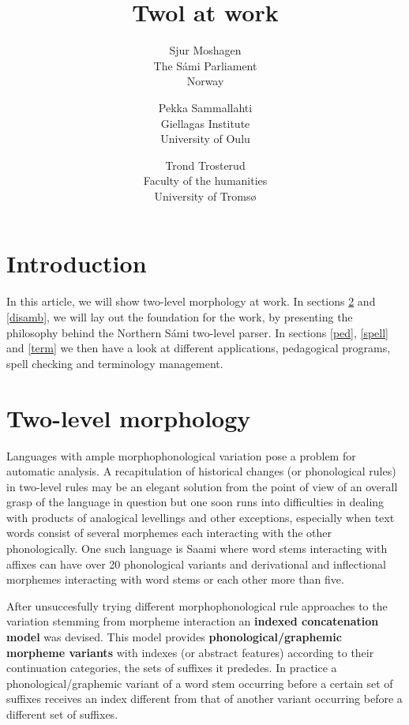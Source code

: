 \documentclass[a4paper,english]{article}
\begin{document}
\title{Twol at work}

\author{Sjur Moshagen\\ The Sámi Parliament\\ Norway
\and Pekka Sammallahti\\ Giellagas Institute\\ University of Oulu
\and Trond Trosterud\\ Faculty of the humanities\\ University of Tromsø}


\maketitle


\section{Introduction}

In this article, we will show two-level morphology at work. In sections \ref{twol} and \ref{disamb}, we will lay out the foundation for the work, by presenting the philosophy behind the Northern Sámi two-level parser. In sections \ref{ped}, \ref{spell} and \ref{term} we then have a look at different applications, pedagogical programs, spell checking and terminology management.

\section{Two-level morphology}\label{twol}

Languages with ample morphophonological variation pose a problem for automatic analysis. A recapitulation of historical changes (or phonological rules) in two-level rules may be an elegant solution from the point of view of an overall grasp of the language in question but one soon runs into difficulties in dealing with products of analogical levellings and other exceptions, especially when text words consist of several morphemes each interacting with the other phonologically. One such language is Saami where word stems interacting with affixes can have over 20 phonological variants and derivational and inflectional morphemes interacting with word stems or each other more than five. 

After unsuccesfully trying different morphophonological rule approaches to the variation stemming from morpheme interaction an \textbf{indexed concatenation model} was devised. This model provides \textbf{phonological/graphemic morpheme variants} with indexes (or abstract features) according to their continuation categories, the sets of suffixes it prededes. In practice a phonological/graphemic variant of a word stem occurring before a certain set of suffixes receives an index different from that of another variant occurring before a different set of suffixes. 
\end{document}

